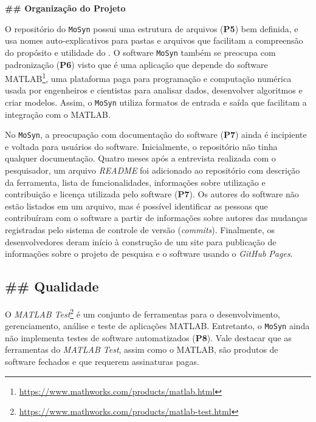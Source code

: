 \noindent \textbf{\#\# Organização do Projeto}

O repositório do \texttt{MoSyn} possui uma estrutura de arquivos (\textbf{P5}) bem definida, e usa nomes auto-explicativos para pastas e arquivos que facilitam a compreensão do propósito e utilidade do \RS.
O software \texttt{MoSyn} também se preocupa com padronização (\textbf{P6}) visto que é uma aplicação que depende do software MATLAB\footnote{\url{https://www.mathworks.com/products/matlab.html}}, uma plataforma paga para programação e computação numérica usada por engenheiros e cientistas para analisar dados, desenvolver algoritmos e criar modelos.
Assim, o \texttt{MoSyn}
utiliza formatos de entrada e saída que facilitam a integração com o MATLAB.


No \texttt{MoSyn}, a preocupação com documentação do software  (\textbf{P7}) ainda é incipiente e voltada para usuários do software.
Inicialmente, o repositório não tinha qualquer documentação. Quatro meses após a entrevista realizada com o pesquisador, um arquivo \textit{README} foi adicionado ao repositório com descrição da ferramenta, lista de funcionalidades, informações sobre utilização e contribuição e licença utilizada pelo software (\textbf{P7}). Os autores do software não estão listados em um arquivo, mas é possível identificar as pessoas que contribuíram com o software a partir de informações sobre autores das mudanças registradas pelo sistema de controle de versão (\textit{commits}). 
Finalmente, os desenvolvedores deram início à construção de um site para publicação de informações sobre o projeto de pesquisa e o software usando o \textit{GitHub Pages}. 

\subsection*{\#\# Qualidade}

O \textit{MATLAB Test}\footnote{\url{https://www.mathworks.com/products/matlab-test.html}} é um conjunto de ferramentas para o desenvolvimento, gerenciamento, análise e teste de aplicações MATLAB.
Entretanto, o \RSw \texttt{MoSyn} ainda não implementa testes de software automatizados
(\textbf{P8}). Vale destacar que as ferramentas do \textit{MATLAB Test}, assim como o MATLAB, são produtos de software fechados e que requerem assinaturas pagas. 


